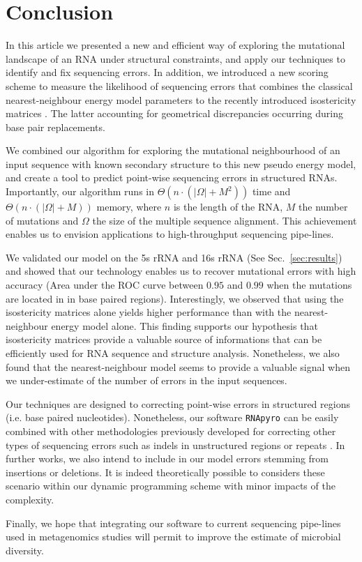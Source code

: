 \section{Conclusion}
\label{sec:conclusion}

In this article we presented a new and efficient way of exploring the mutational landscape of an RNA under structural constraints,
and apply our techniques to identify and fix sequencing errors. In addition, we introduced a new scoring scheme to measure the
likelihood of sequencing errors that combines the classical nearest-neighbour energy model parameters \cite{Turner2010} to the
recently introduced isostericity matrices \cite{Stombaugh2009}. The latter accounting for geometrical discrepancies occurring
during base pair replacements.

We combined our algorithm for exploring the mutational neighbourhood of an input sequence with known secondary structure to
this new pseudo energy model, and create a tool to predict point-wise sequencing errors in structured RNAs. Importantly, our
algorithm runs in  $\Theta(n\cdot(|\Omega|+M^2))$ time and $\Theta(n\cdot(|\Omega|+M))$ memory, where $n$ is the length of
the RNA, $M$ the number of mutations and $\Omega$ the size of the multiple sequence alignment. This achievement enables
us to envision applications to high-throughput sequencing pipe-lines.

We validated our model on the 5s rRNA and 16s rRNA (See Sec.~\ref{sec:results}) and showed that our technology enables us
to recover mutational errors with high accuracy (Area under the ROC curve between $0.95$ and $0.99$ when the mutations are
located in in base paired regions). Interestingly, we observed that using the isostericity matrices alone yields higher performance
than with the nearest-neighbour energy model alone. This finding supports our hypothesis that isostericity matrices provide a
valuable source of informations that can be efficiently used for RNA sequence and structure analysis. Nonetheless, we also found
that the nearest-neighbour model seems to provide a valuable signal when we under-estimate of the number of errors in the input
sequences.

Our techniques are designed to correcting point-wise errors in structured regions (i.e. base paired nucleotides). Nonetheless,
our software \texttt{RNApyro} can be easily combined with other methodologies previously developed for correcting other types
of sequencing errors such as indels in unstructured regions or repeats \cite{Quinlan2008,Quince:2009uq}. In further works, we
also intend to include in our model errors stemming from insertions or deletions. It is indeed theoretically possible to considers
these scenario within our dynamic programming scheme \cite{Waldispuhl:2002fk} with minor impacts of the complexity.

Finally, we hope that integrating our software to current sequencing pipe-lines used in metagenomics studies will permit to
improve the estimate of microbial diversity.


